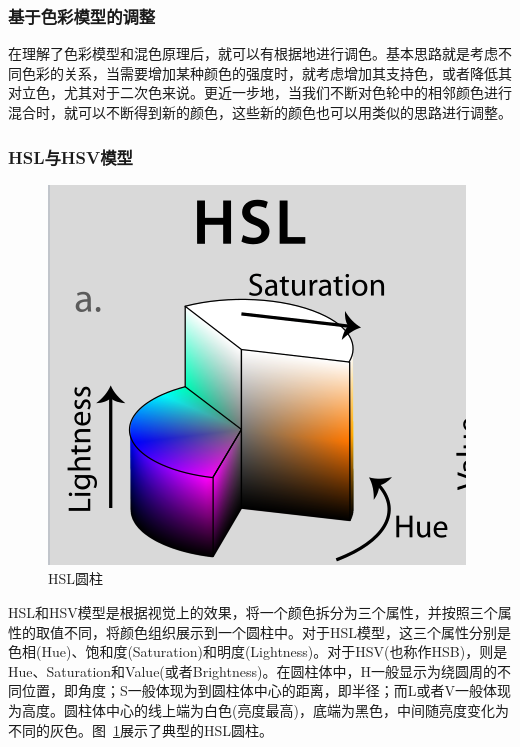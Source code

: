 \documentclass{ctexart}
\begin{document}
\subsubsection{基于色彩模型的调整}
在理解了色彩模型和混色原理后，就可以有根据地进行调色。基本思路就是考虑不同色彩的关系，当需要增加某种颜色的强度时，就考虑增加其支持色，或者降低其对立色，尤其对于二次色来说。更近一步地，当我们不断对色轮中的相邻颜色进行混合时，就可以不断得到新的颜色，这些新的颜色也可以用类似的思路进行调整。

\subsubsection{HSL与HSV模型}
\begin{figure}[h!]
    \centering
    \includegraphics[width=.8\linewidth]{imgs/HSL.png}
    \caption{HSL圆柱}
    \label{fig_hsl}
\end{figure}
HSL和HSV模型是根据视觉上的效果，将一个颜色拆分为三个属性，并按照三个属性的取值不同，将颜色组织展示到一个圆柱中。对于HSL模型，这三个属性分别是色相(Hue)、饱和度(Saturation)和明度(Lightness)。对于HSV(也称作HSB)，则是Hue、Saturation和Value(或者Brightness)。在圆柱体中，H一般显示为绕圆周的不同位置，即角度；S一般体现为到圆柱体中心的距离，即半径；而L或者V一般体现为高度。圆柱体中心的线上端为白色(亮度最高)，底端为黑色，中间随亮度变化为不同的灰色。图~\ref{fig_hsl}展示了典型的HSL圆柱。
\end{document}
